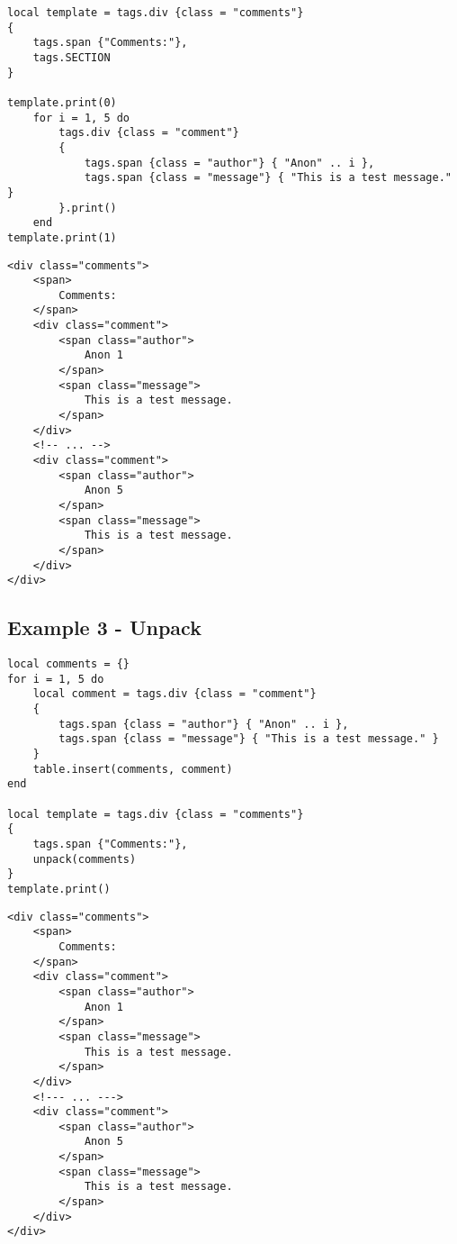 \documentclass[a4paper,11pt]{report}
\newcommand{\setlua}{\lstset{language=Lua}}
\newcommand{\sethtml}{\lstset{language=HTML}}
\begin{document}
\setlua
\begin{lstlisting}
local template = tags.div {class = "comments"}
{
    tags.span {"Comments:"},
    tags.SECTION
}

template.print(0)
    for i = 1, 5 do
        tags.div {class = "comment"}
        {
            tags.span {class = "author"} { "Anon" .. i },
            tags.span {class = "message"} { "This is a test message." }
        }.print()
    end
template.print(1)
\end{lstlisting}

\sethtml
\begin{lstlisting}
<div class="comments">
    <span>
        Comments:
    </span>
    <div class="comment">
        <span class="author">
            Anon 1
        </span>
        <span class="message">
            This is a test message.
        </span>
    </div>
    <!-- ... -->
    <div class="comment">
        <span class="author">
            Anon 5
        </span>
        <span class="message">
            This is a test message.
        </span>
    </div>
</div>
\end{lstlisting}

\subsection{Example 3 - Unpack}

\setlua
\begin{lstlisting}
local comments = {}
for i = 1, 5 do
    local comment = tags.div {class = "comment"}
    {
        tags.span {class = "author"} { "Anon" .. i },
        tags.span {class = "message"} { "This is a test message." }
    }
    table.insert(comments, comment)
end

local template = tags.div {class = "comments"}
{
    tags.span {"Comments:"},
    unpack(comments)
}
template.print()
\end{lstlisting}

\sethtml
\begin{lstlisting}
<div class="comments">
    <span>
        Comments:
    </span>
    <div class="comment">
        <span class="author">
            Anon 1
        </span>
        <span class="message">
            This is a test message.
        </span>
    </div>
    <!--- ... --->
    <div class="comment">
        <span class="author">
            Anon 5
        </span>
        <span class="message">
            This is a test message.
        </span>
    </div>
</div>
\end{lstlisting}
\end{document}
